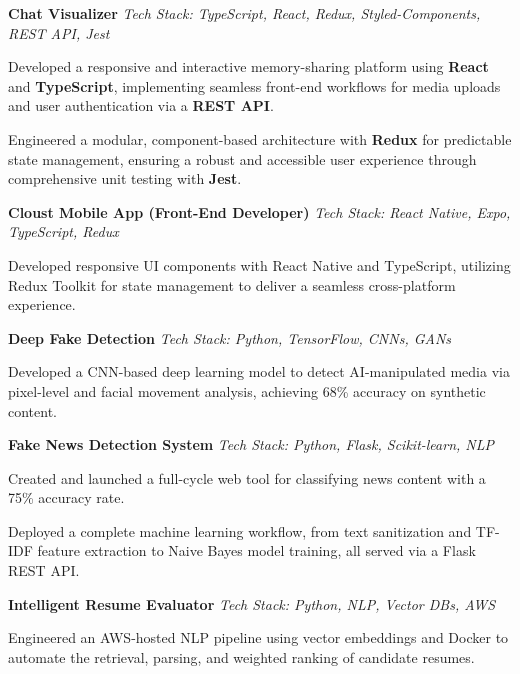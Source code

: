 \textbf{Chat Visualizer} \hfill \textit{Tech Stack: TypeScript, React, Redux, Styled-Components, REST API, Jest}
\begin{highlights}
\item Developed a responsive and interactive memory-sharing platform using \textbf{React} and \textbf{TypeScript}, implementing seamless front-end workflows for media uploads and user authentication via a \textbf{REST API}.
\item Engineered a modular, component-based architecture with \textbf{Redux} for predictable state management, ensuring a robust and accessible user experience through comprehensive unit testing with \textbf{Jest}.
\end{highlights}

\textbf{Cloust Mobile App (Front-End Developer)} \hfill \textit{Tech Stack: React Native, Expo, TypeScript, Redux}
\begin{highlights}
    \item Developed responsive UI components with React Native and TypeScript, utilizing Redux Toolkit for state management to deliver a seamless cross-platform experience.
\end{highlights}

\textbf{Deep Fake Detection} \hfill \textit{Tech Stack: Python, TensorFlow, CNNs, GANs}
\begin{highlights}
\item Developed a CNN-based deep learning model to detect AI-manipulated media via pixel-level and facial movement analysis, achieving 68\% accuracy on synthetic content.
\end{highlights}

\textbf{Fake News Detection System} \hfill \textit{Tech Stack: Python, Flask, Scikit-learn, NLP}
\begin{highlights}
    \item Created and launched a full-cycle web tool for classifying news content with a 75\% accuracy rate.
    \item Deployed a complete machine learning workflow, from text sanitization and TF-IDF feature extraction to Naive Bayes model training, all served via a Flask REST API.
\end{highlights}

\textbf{Intelligent Resume Evaluator} \hfill \textit{Tech Stack: Python, NLP, Vector DBs, AWS}
\begin{highlights}
    \item Engineered an AWS-hosted NLP pipeline using vector embeddings and Docker to automate the retrieval, parsing, and weighted ranking of candidate resumes.
\end{highlights}

